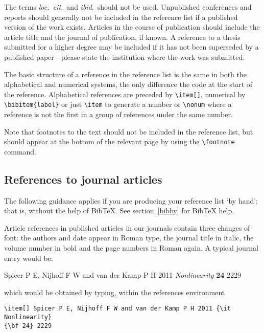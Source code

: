 \documentclass[12pt]{iopart}
\begin{document}
The terms {\it loc.\ cit.}\ and {\it ibid}.\ should not be used. 
Unpublished conferences and reports should generally not be included 
in the reference list if a published version of the work exists. Articles in the course of publication should 
include the article title and the journal of publication, if known. 
A reference to a thesis submitted for a higher degree may be included 
if it has not been superseded by a published 
paper---please state the institution where the work was submitted.

The basic structure of a reference in the reference list is the same in both the alphabetical and numerical systems, the only difference the code at the start of the reference. Alphabetical references are preceded by \verb"\item[]", numerical by \verb"\bibitem{label}" or just \verb"\item" to generate a number or \verb"\nonum" where a reference is not the first in a group of references under the same number.

Note that footnotes to the text should not be 
included in the reference list, but should appear at the bottom of the relevant page by using the \verb"\footnote" command.
   
\subsection{References to journal articles}
The following guidance applies if you are producing your reference list `by hand'; that is,
without the help of BibTeX.  See section~\ref{bibby} for BibTeX help.

Article references in published articles in our journals contain three changes of 
font:
the authors and date appear in Roman type, the journal title in 
italic, the volume number in bold and the page numbers in Roman again. 
A typical journal entry would be:

\smallskip
\begin{harvard}
\item[] Spicer P E, Nijhoff F W and van der Kamp P H 2011 {\it Nonlinearity} {\bf 24} 2229
\end{harvard}
\smallskip

\noindent which would be obtained by typing, within the references
environment 
\small\begin{verbatim}
\item[] Spicer P E, Nijhoff F W and van der Kamp P H 2011 {\it Nonlinearity} 
{\bf 24} 2229
\end{verbatim}\normalsize
\end{document}

